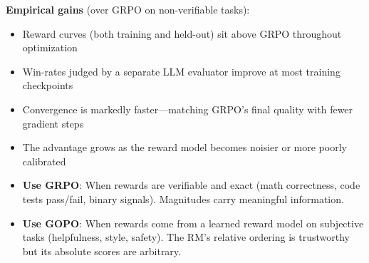 \textbf{Empirical gains} (over GRPO on non-verifiable tasks):

\begin{itemize}
  \item Reward curves (both training and held-out) sit above GRPO throughout optimization
  \item Win-rates judged by a separate LLM evaluator improve at most training checkpoints
  \item Convergence is markedly faster---matching GRPO’s final quality with fewer gradient steps
  \item The advantage grows as the reward model becomes noisier or more poorly calibrated
\end{itemize}

\begin{intuitionbox}
\begin{itemize}
  \item \textbf{Use GRPO}: When rewards are verifiable and exact (math correctness, code tests pass/fail, binary signals). Magnitudes carry meaningful information.
  \item \textbf{Use GOPO}: When rewards come from a learned reward model on subjective tasks (helpfulness, style, safety). The RM’s relative ordering is trustworthy but its absolute scores are arbitrary.
\end{itemize}
\end{intuitionbox}

